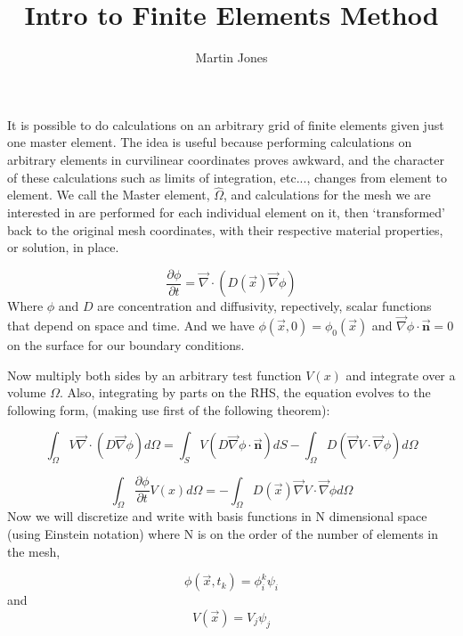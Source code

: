 \documentclass{article}
\begin{document}
\title{Intro to Finite Elements Method}
\date{}
\author{Martin Jones}
\maketitle
\thispagestyle{empty}
It is possible to do calculations on an arbitrary grid of finite elements given just one master element. The idea is useful because performing calculations on arbitrary elements in curvilinear coordinates proves awkward, and the character of these calculations such as limits of integration, etc..., changes from element to element.
We call the Master element, $\hat{\Omega}$, and calculations for the mesh we are interested in are performed for each individual element on it, then `transformed' back to the original mesh coordinates, with their respective material properties, or solution, in place.

\begin{equation} 
\frac{\partial \phi}{\partial t} = \vec{\nabla} \cdot (D(\vec{x})\vec{\nabla} \phi)
\end{equation} 
Where $\phi$ and $D$ are concentration and diffusivity, repectively, scalar functions that depend on space and time. And we have $\phi(\vec{x},0)=\phi_{0}(\vec{x})$ and $\vec{\nabla}\phi \cdot \vec{\mathbf{n}}=0$ on the surface for our boundary conditions.

Now multiply both sides by an arbitrary test function $V(x)$ and integrate over a volume $\Omega$. Also, integrating by parts on the RHS, the equation evolves to the following form,  (making use first of the following theorem):

\begin{displaymath}
\int_{\Omega}V\vec{\nabla}\cdot(D\vec{\nabla}\phi)d\Omega=\int_{S}V(D\vec{\nabla}\phi\cdot \vec{\mathbf{n}})dS-\int_{\Omega}D(\vec{\nabla}V\cdot \vec{\nabla} \phi)d\Omega
\end{displaymath}

 \begin{equation} 
\int_{\Omega} \frac{\partial \phi}{\partial t} V(x)d\Omega = -\int_{\Omega}D(\vec{x})\vec{\nabla}V \cdot\vec{\nabla} \phi d\Omega
\end{equation}
Now we will discretize and write with basis functions in N dimensional space (using Einstein notation) where N is on the order of the number of elements in the mesh,

\begin{equation}
\phi (\vec{x},t_{k})=\phi_{i}^{k}\psi_{i}
\end{equation}and
\begin{equation}
V(\vec{x})=V_{j}\psi_{j}
\end{equation}
\end{document}
